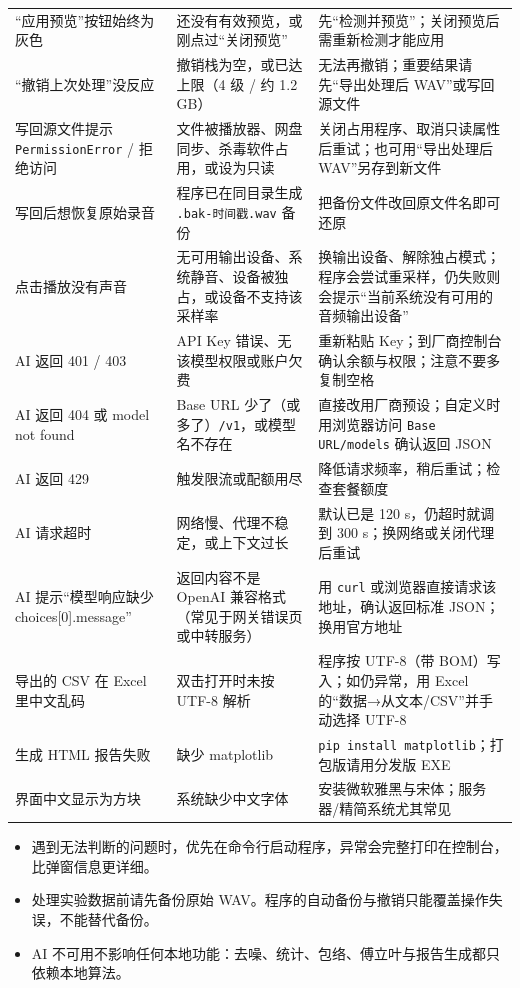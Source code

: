 \documentclass[UTF8,a4paper,12pt,scheme=chinese]{ctexart}
\begin{document}
{\begin{longtable}{@{}>{\raggedright\arraybackslash}p{}>{\raggedright\arraybackslash}p{}>{\raggedright\arraybackslash}p{}@{}}
“应用预览”按钮始终为灰色 & 还没有有效预览，或刚点过“关闭预览” & 先“检测并预览”；关闭预览后需重新检测才能应用 \\
“撤销上次处理”没反应 & 撤销栈为空，或已达上限（4 级 / 约 1.2 GB） & 无法再撤销；重要结果请先“导出处理后 WAV”或写回源文件 \\
写回源文件提示 \texttt{PermissionError} / 拒绝访问 & 文件被播放器、网盘同步、杀毒软件占用，或设为只读 & 关闭占用程序、取消只读属性后重试；也可用“导出处理后 WAV”另存到新文件 \\
写回后想恢复原始录音 & 程序已在同目录生成 \texttt{.bak-时间戳.wav} 备份 & 把备份文件改回原文件名即可还原 \\
点击播放没有声音 & 无可用输出设备、系统静音、设备被独占，或设备不支持该采样率 & 换输出设备、解除独占模式；程序会尝试重采样，仍失败则会提示“当前系统没有可用的音频输出设备” \\
AI 返回 401 / 403 & API Key 错误、无该模型权限或账户欠费 & 重新粘贴 Key；到厂商控制台确认余额与权限；注意不要多复制空格 \\
AI 返回 404 或 model not found & Base URL 少了（或多了）\texttt{/v1}，或模型名不存在 & 直接改用厂商预设；自定义时用浏览器访问 \texttt{Base URL/models} 确认返回 JSON \\
AI 返回 429 & 触发限流或配额用尽 & 降低请求频率，稍后重试；检查套餐额度 \\
AI 请求超时 & 网络慢、代理不稳定，或上下文过长 & 默认已是 120 s，仍超时就调到 300 s；换网络或关闭代理后重试 \\
AI 提示“模型响应缺少 choices[0].message” & 返回内容不是 OpenAI 兼容格式（常见于网关错误页或中转服务） & 用 \texttt{curl} 或浏览器直接请求该地址，确认返回标准 JSON；换用官方地址 \\
导出的 CSV 在 Excel 里中文乱码 & 双击打开时未按 UTF-8 解析 & 程序按 UTF-8（带 BOM）写入；如仍异常，用 Excel 的“数据→从文本/CSV”并手动选择 UTF-8 \\
生成 HTML 报告失败 & 缺少 matplotlib & \texttt{pip install matplotlib}；打包版请用分发版 EXE \\
界面中文显示为方块 & 系统缺少中文字体 & 安装微软雅黑与宋体；服务器/精简系统尤其常见 \\
\end{longtable}
}

\begin{itemize}
  \item 遇到无法判断的问题时，优先在命令行启动程序，异常会完整打印在控制台，比弹窗信息更详细。
  \item 处理实验数据前请先备份原始 WAV。程序的自动备份与撤销只能覆盖操作失误，不能替代备份。
  \item AI 不可用不影响任何本地功能：去噪、统计、包络、傅立叶与报告生成都只依赖本地算法。
\end{itemize}
\end{document}
